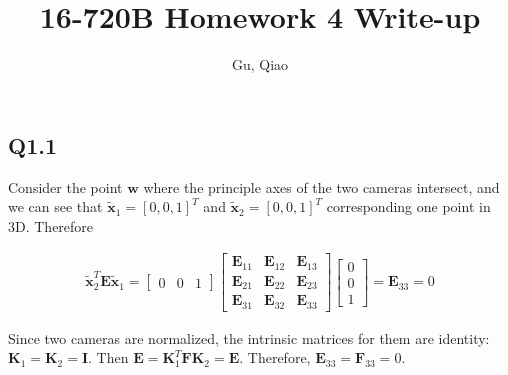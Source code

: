 \documentclass[11pt]{article}
\begin{document}
\author{Gu, Qiao}
\title{16-720B Homework 4 Write-up}
\maketitle

\medskip

\subsection*{Q1.1}

\newcommand{\intrinsic}{\mathbf{K}}
\newcommand{\fundamental}{\mathbf{F}}
\newcommand{\essential}{\mathbf{E}}
\newcommand{\homox}{\tilde{\mathbf{x}}}

Consider the point $\mathbf{w}$ where the principle axes of the two cameras intersect, and we can see that $\homox_1=[0,0,1]^T$ and $\homox_2=[0,0,1]^T$ corresponding one point in 3D. Therefore

\begin{align}
    \homox_2^T \essential \homox_1 =
    \begin{bmatrix}
        0 & 0 & 1
    \end{bmatrix}
    \begin{bmatrix}
        \essential_{11} & \essential_{12} & \essential_{13} \\
        \essential_{21} & \essential_{22} & \essential_{23} \\
        \essential_{31} & \essential_{32} & \essential_{33}
    \end{bmatrix}
    \begin{bmatrix}
        0 \\ 0 \\ 1
    \end{bmatrix}
    = \essential_{33} = 0
\end{align}

Since two cameras are normalized, the intrinsic matrices for them are identity:  $\intrinsic_1=\intrinsic_2=\mathbf{I}$.
Then $\essential = \intrinsic_1^T \fundamental \intrinsic_2 = \essential$.
Therefore, $\essential_{33} = \fundamental_{33}=0$.

%
\end{document}
